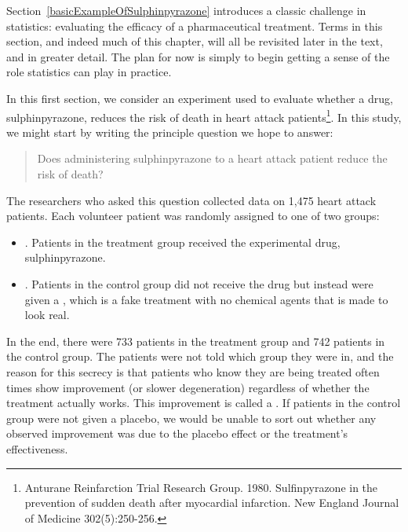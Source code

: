 
Section~\ref{basicExampleOfSulphinpyrazone} introduces a classic challenge in statistics: evaluating the efficacy of a pharmaceutical treatment. Terms in this section, and indeed much of this chapter, will all be revisited later in the text, and in greater detail. The plan for now is simply to begin getting a sense of the role statistics can play in practice.

In this first section, we consider an experiment used to evaluate whether a drug, sulphinpyrazone, reduces the risk of death in heart attack patients\footnote{Anturane Reinfarction Trial Research Group. 1980. Sulfinpyrazone in the prevention of sudden death after myocardial infarction. New England Journal of Medicine 302(5):250-256.}. In this study, we might start by writing the principle question we hope to answer:
\begin{quote}
Does administering sulphinpyrazone to a heart attack patient reduce the risk of death?
\end{quote}

The researchers who asked this question collected data on 1,475 heart attack patients. 
Each volunteer patient was randomly assigned to one of two groups:
\begin{itemize}
\item[]. Patients in the treatment group received the experimental drug, sulphinpyrazone.
\item[]. Patients in the control group did not receive the drug but instead were given a , which is a fake treatment with no chemical agents that is made to look real.
\end{itemize}
In the end, there were 733 patients in the treatment group and 742 patients in the control group. The patients were not told which group they were in, and the reason for this secrecy is that patients who know they are being treated often times show improvement (or slower degeneration) regardless of whether the treatment actually works. This improvement is called a . If patients in the control group were not given a placebo, we would be unable to sort out whether any observed improvement was due to the placebo effect or the treatment's effectiveness.

